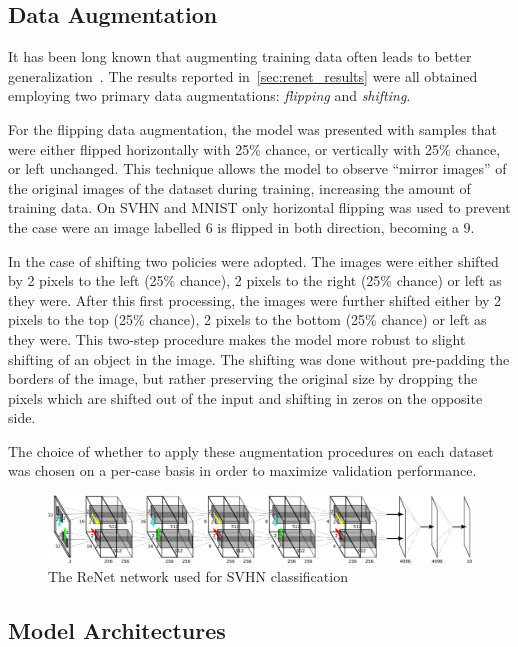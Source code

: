 \subsection{Data Augmentation}

It has been long known that augmenting training data often leads to better
generalization~\citep[see, e.g.,][]{Krizhevsky-2012}. The results reported
in~\autoref{sec:renet_results} were all obtained employing two primary data
augmentations: {\it flipping} and {\it shifting}.

For the flipping data augmentation, the model was presented with samples that
were either flipped horizontally with 25\% chance, or vertically with 25\%
chance, or left unchanged. This technique allows the model to observe ``mirror
images'' of the original images of the dataset during training, increasing the
amount of training data. On SVHN and MNIST only horizontal flipping was used
to prevent the case were an image labelled $6$ is flipped in both direction,
becoming a $9$.

In the case of shifting two policies were adopted. The images were either
shifted by 2 pixels to the left (25\% chance), 2 pixels to the right (25\%
chance) or left as they were. After this first processing, the images were
further shifted either by 2 pixels to the top (25\% chance), 2 pixels to the
bottom (25\% chance) or left as they were. This two-step procedure makes the
model more robust to slight shifting of an object in the image. The shifting
was done without pre-padding the borders of the image, but rather preserving
the original size by dropping the pixels which are shifted out of the input
and shifting in zeros on the opposite side.

The choice of whether to apply these augmentation procedures on each dataset
was chosen on a per-case basis in order to maximize validation performance.

\begin{figure}[t]
    \centering
    \includegraphics[height=.14\textheight,width=\columnwidth]{pdf/renet_svhn.pdf}
    \caption{The ReNet network used for SVHN classification}
    \label{fig:network}
\end{figure}

\subsection{Model Architectures}

